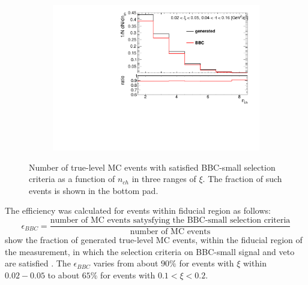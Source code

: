\begin{figure}[h!]
\begin{subfigure}{.45\textwidth}
	\end{subfigure}
	\begin{subfigure}{.45\textwidth}
		\includegraphics[width=\textwidth,page=3]{chapters/chrgSTAR/img/bbcCorrection/xi_bbc.pdf}
	\end{subfigure}
	\begin{minipage}{.45\textwidth}
		\caption[Number of true-level MC events with satisfied BBC-small selection criteria  as a function of $n_{ch}$ in three ranges of $\xi$]{Number of true-level MC events with satisfied BBC-small selection criteria  as a function of $n_{ch}$ in three ranges of $\xi$. The fraction of such events is shown in the bottom pad.}
		\label{fig:bbcCorection_nch}
	\end{minipage}
	
\end{figure}
The efficiency was calculated  for events within fiducial region as follows:
\begin{equation}
\epsilon_{BBC}=\frac{\textrm{number of MC events satysfying the BBC-small selection criteria}}{\textrm{number of MC events}}
\end{equation}
 show the fraction of generated true-level MC events, within the fiducial region of the measurement, in which the selection criteria on BBC-small signal and veto are satisfied . The $\epsilon_{BBC}$  varies from about $90\%$ for events with $\xi$ within $0.02-0.05$ to about $65\%$ for events with $0.1<\xi<0.2$.
